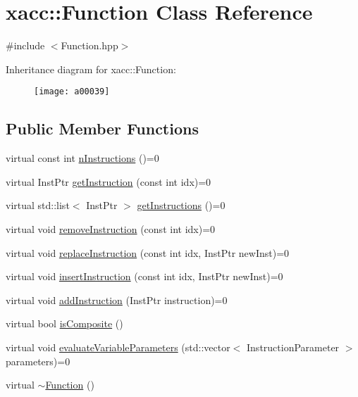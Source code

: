 \hypertarget{a00039}{}\section{xacc\+:\+:Function Class Reference}
\label{a00039}


{\ttfamily \#include $<$Function.\+hpp$>$}

Inheritance diagram for xacc\+:\+:Function\+:\begin{figure}[H]
\begin{center}
\leavevmode
\texttt{[image: a00039]}
\end{center}
\end{figure}
\subsection*{Public Member Functions}
\begin{DoxyCompactItemize}
\item 
virtual const int \hyperlink{a00039_a8901985525f59713e14c61713e07c086}{n\+Instructions} ()=0
\item 
virtual Inst\+Ptr \hyperlink{a00039_afa549fc91b5a05f26d8139954a7e0ed5}{get\+Instruction} (const int idx)=0
\item 
virtual std\+::list$<$ Inst\+Ptr $>$ \hyperlink{a00039_aaf80bd3d49113a92b520785572663032}{get\+Instructions} ()=0
\item 
virtual void \hyperlink{a00039_ab6478b09bb28e194bb555b3180737733}{remove\+Instruction} (const int idx)=0
\item 
virtual void \hyperlink{a00039_a2ef6a4923a6734f90f6ee3d94d263af0}{replace\+Instruction} (const int idx, Inst\+Ptr new\+Inst)=0
\item 
virtual void \hyperlink{a00039_acde702e44bdbc2759b338365218d7ebe}{insert\+Instruction} (const int idx, Inst\+Ptr new\+Inst)=0
\item 
virtual void \hyperlink{a00039_aa8c9ec2d08be75c69399d4254b0216f5}{add\+Instruction} (Inst\+Ptr instruction)=0
\item 
virtual bool \hyperlink{a00039_aa75500c657b5c3e0e36213e1506aad97}{is\+Composite} ()
\item 
virtual void \hyperlink{a00039_af6ae9453027789a2aaec30e59c9e45e3}{evaluate\+Variable\+Parameters} (std\+::vector$<$ Instruction\+Parameter $>$ parameters)=0
\item 
virtual \hyperlink{a00039_a04b25ba4da1ddfa4ec4ec6d6ffb25bc3}{$\sim$\+Function} ()
\end{DoxyCompactItemize}

